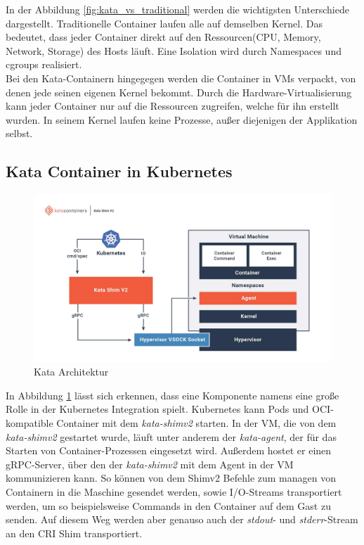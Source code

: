 In der Abbildung \ref{fig:kata_vs_traditional} werden die wichtigsten Unterschiede dargestellt.
Traditionelle Container laufen alle auf demselben Kernel. 
Das bedeutet, dass jeder Container direkt auf den Ressourcen(\ac{CPU}, Memory, Network, Storage) des Hosts läuft. 
Eine Isolation wird durch Namespaces und cgroups realisiert.
\\
Bei den Kata-Containern hingegegen werden die Container in \ac{VM}s verpackt, von denen jede seinen eigenen Kernel bekommt.
Durch die Hardware-Virtualisierung kann jeder Container nur auf die Ressourcen zugreifen, welche für ihn erstellt wurden. 
In seinem Kernel laufen keine Prozesse, außer diejenigen der Applikation selbst.  

\subsection{Kata Container in Kubernetes}

\begin{figure}[ht]
        \centering
        \includegraphics[width=\textwidth]{bilder/katacontainers_architecture_diagram.jpg}
        \caption{Kata Architektur\cite{kata_learn}}
        \label{fig:kata_architecture}
\end{figure}

In Abbildung \ref{fig:kata_architecture} lässt sich erkennen, dass eine Komponente namens  eine große Rolle in der Kubernetes Integration spielt.
Kubernetes kann Pods und \ac{OCI}-kompatible Container mit dem \textit{kata-shimv2} starten. 
In der \ac{VM}, die von dem \textit{kata-shimv2} gestartet wurde, läuft unter anderem der \textit{kata-agent}, der für das Starten von Container-Prozessen eingesetzt wird.
Außerdem hostet er einen \ac{gRPC}-Server, über den der \textit{kata-shimv2} mit dem Agent in der \ac{VM} kommunizieren kann.
So können von dem Shimv2 Befehle zum managen von Containern in die Maschine gesendet werden, sowie \ac{I/O}-Streams transportiert werden, um so beispielsweise Commands in den Container auf dem Gast zu senden.
Auf diesem Weg werden aber genauso auch der \textit{stdout}- und \textit{stderr}-Stream an den \ac{CRI} Shim transportiert.
\cite{kata_architecture}

